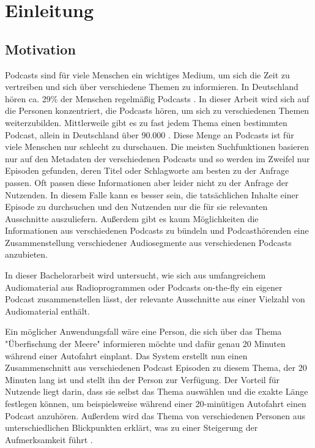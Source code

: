\chapter{Einleitung}\label{ch:intro}

\section{Motivation}

Podcasts sind für viele Menschen ein wichtiges Medium, um sich die Zeit zu vertreiben und sich über verschiedene Themen zu informieren. 
In Deutschland hören ca. 29\% der Menschen regelmäßig Podcasts \cite{newman2022}.
In dieser Arbeit wird sich auf die Personen konzentriert, die Podcasts hören, um sich zu verschiedenen Themen weiterzubilden.
Mittlerweile gibt es zu fast jedem Thema einen bestimmten Podcast, allein in Deutschland über 90.000 \cite{listennotes}.
Diese Menge an Podcasts ist für viele Menschen nur schlecht zu durschauen.
Die meisten Suchfunktionen basieren nur auf den Metadaten der verschiedenen Podcasts und so werden im Zweifel nur Episoden gefunden, deren Titel oder Schlagworte am besten zu der Anfrage passen.
Oft passen diese Informationen aber leider nicht zu der Anfrage der Nutzenden.
In diesem Falle kann es besser sein, die tatsächlichen Inhalte einer Episode zu durchsuchen und den Nutzenden nur die für sie relevanten Ausschnitte auszuliefern.
Außerdem gibt es kaum Möglichkeiten die Informationen aus verschiedenen Podcasts zu bündeln und Podcasthörenden eine Zusammenstellung verschiedener Audiosegmente aus verschiedenen Podcasts anzubieten.

In dieser Bachelorarbeit wird untersucht, wie sich aus umfangreichem Audiomaterial aus Radioprogrammen oder Podcasts on-the-fly ein eigener Podcast zusammenstellen lässt, der relevante Ausschnitte aus einer Vielzahl von Audiomaterial enthält.

Ein möglicher Anwendungsfall wäre eine Person, die sich über das Thema "Überfischung der Meere" informieren möchte und dafür genau 20 Minuten während einer Autofahrt einplant. 
Das System erstellt nun einen Zusammenschnitt aus verschiedenen Podcast Episoden zu diesem Thema, der 20 Minuten lang ist und stellt ihn der Person zur Verfügung. 
Der Vorteil für Nutzende liegt darin, dass sie selbst das Thema auswählen und die exakte Länge festlegen können, um beispielsweise während einer 20-minütigen Autofahrt einen Podcast anzuhören. 
Außerdem wird das Thema von verschiedenen Personen aus unterschiedlichen Blickpunkten erklärt, was zu einer Steigerung der Aufmerksamkeit führt \cite{kang2012}. 



